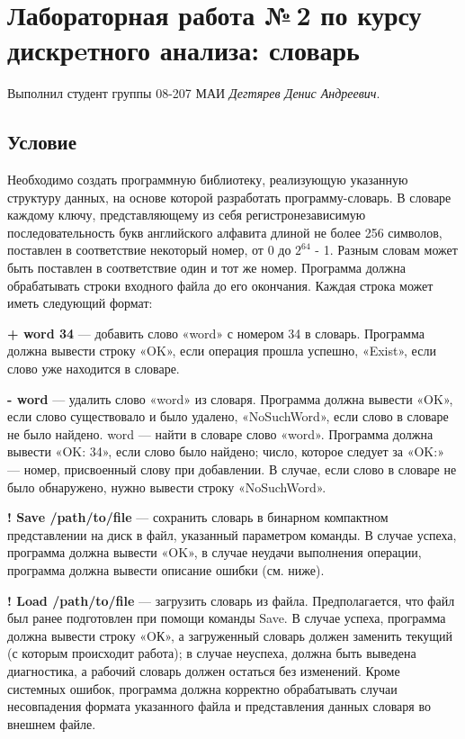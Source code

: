\documentclass[12pt]{article}
\begin{document}
\section*{Лабораторная работа №\,2 по курсу дискрeтного анализа: словарь}

Выполнил студент группы 08-207 МАИ \textit{Дегтярев Денис Андреевич}.

\subsection*{Условие}

Необходимо создать программную библиотеку, реализующую
указанную структуру данных, на основе которой разработать
программу-словарь. В словаре каждому ключу, представляющему из
себя регистронезависимую последовательность букв английского
алфавита длиной не более 256 символов, поставлен в соответствие
некоторый номер, от 0 до $2^{64}$ - 1. Разным словам может быть
поставлен в соответствие один и тот же номер.  
Программа должна обрабатывать строки входного файла до его
окончания. Каждая строка может иметь следующий формат:  

\hspace{1 cm} \textbf{+ word 34} — добавить слово «word» с номером 34 в словарь. Программа должна вывести строку «OK», если операция прошла
успешно, «Exist», если слово уже находится в словаре.  

\hspace{1 cm} \textbf{- word} — удалить слово «word» из словаря. Программа должна
вывести «OK», если слово существовало и было удалено,
«NoSuchWord», если слово в словаре не было найдено.
word — найти в словаре слово «word». Программа должна вывести
«OK: 34», если слово было найдено; число, которое следует за
«OK:» — номер, присвоенный слову при добавлении. В случае,
если слово в словаре не было обнаружено, нужно вывести строку
«NoSuchWord».  

\hspace{1 cm} \textbf{! Save /path/to/file} — сохранить словарь в бинарном компактном
представлении на диск в файл, указанный параметром команды.
В случае успеха, программа должна вывести «OK», в случае
неудачи выполнения операции, программа должна вывести
описание ошибки (см. ниже).  

\hspace{1 cm} \textbf{! Load /path/to/file} — загрузить словарь из файла. Предполагается,
что файл был ранее подготовлен при помощи команды Save. В
случае успеха, программа должна вывести строку «OК», а
загруженный словарь должен заменить текущий (с которым
происходит работа); в случае неуспеха, должна быть выведена
диагностика, а рабочий словарь должен остаться без изменений.
Кроме системных ошибок, программа должна корректно
обрабатывать случаи несовпадения формата указанного файла и
представления данных словаря во внешнем файле.  
\end{document}
